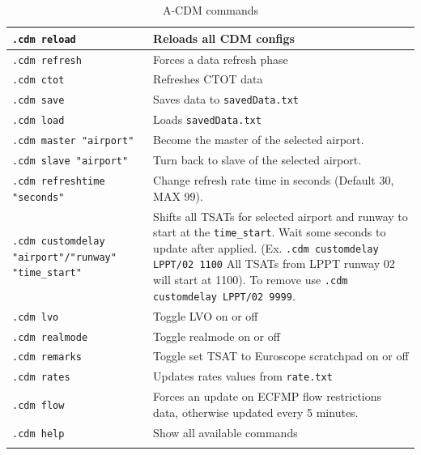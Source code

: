 \documentclass[a4paper,oneside,11pt]{memoir}
\begin{document}
\begin{longtable}{|p{5cm}|p{8.5cm}|}
  \hline
  \texttt{.cdm reload}                                      & Reloads all CDM configs\\ \hline
  \texttt{.cdm refresh}                                     & Forces a data refresh phase\\ \hline
  \texttt{.cdm ctot}                                        & Refreshes CTOT data\\ \hline
  \texttt{.cdm save}                                        & Saves data to \texttt{savedData.txt}\\ \hline
  \texttt{.cdm load}                                        & Loads \texttt{savedData.txt}\\ \hline
  \texttt{.cdm master "airport"}                            & Become the master of the selected airport.\\ \hline
  \texttt{.cdm slave "airport"}                             & Turn back to slave of the selected airport.\\ \hline
  \texttt{.cdm refreshtime "seconds"}                       & Change refresh rate time in seconds (Default 30, MAX 99).\\ \hline
  \texttt{.cdm customdelay "airport"/"runway" "time\_start"} & Shifts all TSATs for selected airport and runway to start at the \texttt{time\_start}. Wait some seconds to update after applied. (Ex. \texttt{.cdm customdelay LPPT/02 1100} All TSATs from LPPT runway 02 will start at 1100). To remove use \texttt{.cdm customdelay LPPT/02 9999}.\\ \hline
  \texttt{.cdm lvo}                                         & Toggle LVO on or off\\ \hline
  \texttt{.cdm realmode}                                    & Toggle realmode on or off\\ \hline
  \texttt{.cdm remarks}                                     & Toggle set TSAT to Euroscope scratchpad on or off\\ \hline
  \texttt{.cdm rates}                                       & Updates rates values from \texttt{rate.txt}\\ \hline
  \texttt{.cdm flow }                                       & Forces an update on ECFMP flow restrictions data, otherwise updated every 5 minutes.\\ \hline
  \texttt{.cdm help}                                        & Show all available commands \\ \hline
  \caption{A-CDM commands}
  \label{tab:acdm-commands}
\end{longtable}
\end{document}
